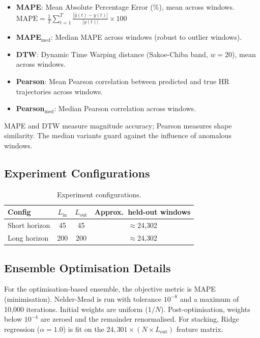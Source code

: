 \documentclass[11pt,a4paper]{article}
\begin{document}
\begin{itemize}
  \item \textbf{MAPE}: Mean Absolute Percentage Error (\%), mean across
        windows.
        $\mathrm{MAPE} = \frac{1}{T}\sum_{t=1}^{T}
        \frac{|\hat{y}(t)-y(t)|}{|y(t)|}\times 100$
  \item \textbf{MAPE$_{\mathrm{med}}$}: Median MAPE across windows (robust to
        outlier windows).
  \item \textbf{DTW}: Dynamic Time Warping distance (Sakoe-Chiba band,
        $w=20$), mean across windows.
  \item \textbf{Pearson}: Mean Pearson correlation between predicted and true
        HR trajectories across windows.
  \item \textbf{Pearson$_{\mathrm{med}}$}: Median Pearson correlation across
        windows.
\end{itemize}

MAPE and DTW measure magnitude accuracy; Pearson measures shape similarity.
The median variants guard against the influence of anomalous windows.

\subsection{Experiment Configurations}

\begin{table}[H]
  \centering
  \caption{Experiment configurations.}
  \label{tab:configs}
  \begin{tabular}{lccc}
    \toprule
    Config & $L_{\mathrm{in}}$ & $L_{\mathrm{out}}$ & Approx.\ held-out windows \\
    \midrule
    Short horizon & 45  & 45  & $\approx$24{,}302 \\
    Long horizon  & 200 & 200 & $\approx$24{,}302 \\
    \bottomrule
  \end{tabular}
\end{table}

\subsection{Ensemble Optimisation Details}

For the optimisation-based ensemble, the objective metric is MAPE
(minimisation).  Nelder-Mead is run with tolerance $10^{-8}$ and a maximum of
10{,}000 iterations.  Initial weights are uniform ($1/N$).
Post-optimisation, weights below $10^{-4}$ are zeroed and the remainder
renormalised.  For stacking, Ridge regression ($\alpha=1.0$) is fit on the
$24{,}301\times(N\times L_{\mathrm{out}})$ feature matrix.
\end{document}
